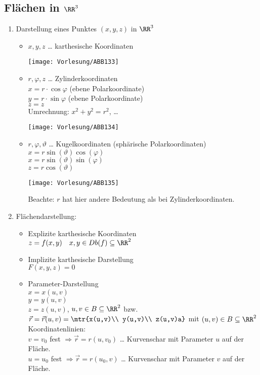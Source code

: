 \subsection{Flächen in \texorpdfstring{$\RR^3$}{}}
\begin{enumerate}
\item Darstellung eines Punktes $(x,y,z)$ in $\RR^3$
\begin{itemize}
\item $x,y,z$ … karthesische Koordinaten
\begin{center}
\texttt{[image: Vorlesung/ABB133]}
\end{center}
\item $r, \varphi, z$ … Zylinderkoordinaten\\
$x=r\cdot \cos \varphi$ (ebene Polarkoordinate)\\
$y= r \cdot \sin \varphi$ (ebene Polarkoordinate)\\
$z=z$\\
Umrechnung: $x^2+y^2=r^2$, …
\begin{center}
\texttt{[image: Vorlesung/ABB134]}
\end{center}
\item $r, \varphi, \vartheta$ … Kugelkoordinaten (sphärische Polarkoordinaten)\\
$x=r\sin(\vartheta) \cos (\varphi)$\\
$x=r\sin(\vartheta) \sin(\varphi)$\\
$z=r\cos (\vartheta)$
\begin{center}
\texttt{[image: Vorlesung/ABB135]}
\end{center}
Beachte: $r$ hat hier andere Bedeutung als bei Zylinderkoordinaten.
\end{itemize}
\item Flächendarstellung:
\begin{itemize}
\item Explizite karthesische Koordinaten\\
$z=f(x,y) \quad x,y \in Db(f) \subseteq \RR^2$
\item Implizite karthesische Darstellung\\
$F(x,y,z) = 0$
\item Parameter-Darstellung\\
$x=x(u,v)$\\
$y=y(u,v)$\\
$z=z(u,v)$, \quad $u,v \in B\subseteq \RR^2$ bzw.\\
$\vec{r}=\vec{r}(u,v) = \mtr{x(u,v)\\ y(u,v)\\ z(u,v)a}$ \quad mit $(u,v) \in B \subseteq \RR^2$\\
Koordinatenlinien: \\
$v=v_0$ fest $\Rightarrow \vec{r}=r(u,v_0)$ … Kurvenschar mit Parameter $u$ auf der Fläche.\\
$u=u_0$ fest $\Rightarrow \vec{r}=r(u_0, v)$ … Kurvenschar mit Parameter $v$ auf der Fläche.
\end{itemize}
\end{enumerate}
